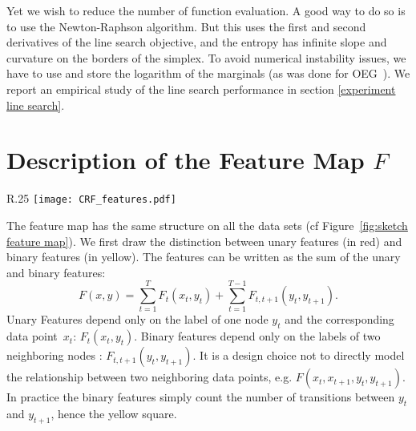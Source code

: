 \begin{subappendices}
Yet we wish to reduce the number of function evaluation.
A good way to do so is to use the Newton-Raphson algorithm.
But this uses the first and second derivatives of the line search objective, and the entropy has infinite slope and curvature on the borders of the simplex.
To avoid numerical instability issues, we have to use and store the logarithm of the marginals (as was done for OEG~\citep{collins2008exponentiated}).
We report an empirical study of the line search performance in section \ref{experiment line search}.

\section{Description of the Feature Map $F$}
\label{app:feature}
\begin{wrapfigure}[20]{R}{.25\textwidth}
\centering
    \texttt{[image: CRF\_features.pdf]}
    \caption[Sketch of sequence feature maps]{Sketch of the feature map. K is the number of different labels for one node. A is the number of attributes.}
    \label{fig:sketch feature map}
\end{wrapfigure}

The feature map has the same structure on all the data sets (cf Figure~\ref{fig:sketch feature map}).
We first draw the distinction between unary features (in red) and binary features (in yellow). The features can be written as the sum of the unary and binary features:
\begin{equation*}
	F(x, y) = \sum_{t=1}^T F_t(x_t, y_t) +  \sum_{t=1}^{T-1} F_{t, t+1}(y_t, y_{t+1}).
\end{equation*}
Unary Features depend only on the label of one node $y_t$ and the corresponding data point~$x_t$: $F_t(x_t, y_t)$.
Binary features depend only on the labels of two neighboring nodes : $F_{t, t+1}(y_t, y_{t+1})$.
It is a design choice not to directly model the relationship between two neighboring data points, e.g. $F(x_t, x_{t+1}, y_t, y_{t+1})$.
In practice the binary features simply count the number of transitions between $y_t$ and $y_{t+1}$, hence the yellow square.


\end{subappendices}
